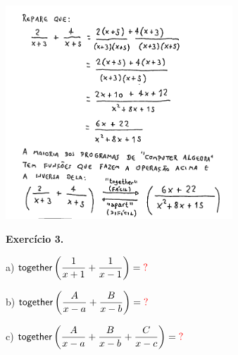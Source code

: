 \documentclass[oneside,12pt]{article}
\begin{document}
\newpage

%
\includegraphics[height=8cm]{2020-1-C2/20201112_C2_fracoes_parciais_2.pdf}

%

\newpage


{\bf Exercício 3.}

\msk

a) $\D \togetherp{\frac{1}{x+1} + \frac{1}{x-1}} = \ColorRed{?}$ 

\ssk

b) $\D \togetherp{\frac{A}{x-a} + \frac{B}{x-b}} = \ColorRed{?}$ 

\ssk

c) $\D \togetherp{\frac{A}{x-a} + \frac{B}{x-b} + \frac{C}{x-c}} = \ColorRed{?}$ 
\end{document}
